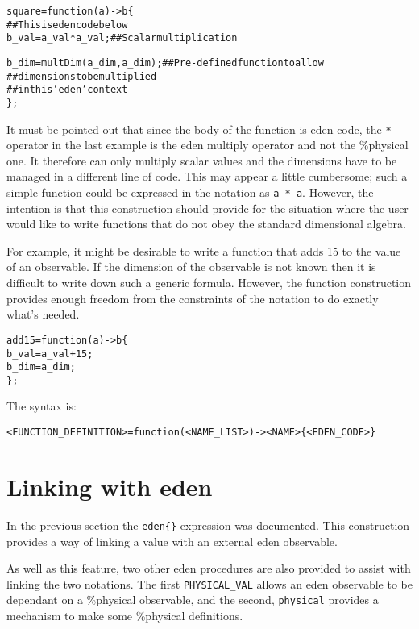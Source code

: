 \documentclass[a4paper]{article}
\begin{document}
\begin{alltt}
%physical
square = function (a) -> b \{
	## This is eden code below
	b_val = a_val*a_val;               ## Scalar multiplication

	b_dim = multDim(a_dim,a_dim);      ## Pre-defined function to allow
	                                   ##   dimensions to be multiplied
	                                   ##   in this 'eden' context 
\};
\end{alltt}
It must be pointed out that since the body of the function is eden code,
 the \texttt{*} operator in the last example is the
eden multiply operator and not the \%physical one. It therefore 
can only multiply scalar values and the dimensions have to be managed in a 
different line of code.
This may appear a little cumbersome; such a simple function
could be expressed in the notation as \texttt{a * a}. However, the 
intention is that this construction should provide for the situation where the 
user would
like to write functions that do not obey the standard dimensional algebra.

For example, it might be desirable to write a function that adds 15 to the
value of an observable. If the dimension of the observable is not known then 
it is difficult to write down such a generic formula. However, the function
construction provides enough freedom from the constraints of the notation to
do exactly what's needed.

\begin{alltt}
%physical
add15 = function (a) -> b \{
        b_val = a_val+15;
        b_dim = a_dim;     
\};
\end{alltt}





The syntax is:
\begin{alltt}
<FUNCTION_DEFINITION>  = function ( <NAME_LIST> ) -> <NAME> \{ <EDEN_CODE> \}
\end{alltt}


\section{Linking with eden}
In the previous section the \texttt{eden\{\}} expression was documented. This 
construction provides 
a way of linking a value with an external eden observable.

As well as this feature, two other eden procedures are also provided to assist 
with linking the two notations. The first \texttt{PHYSICAL\_VAL} 
allows an eden observable to be 
dependant on a \%physical observable, and the second, \texttt{physical} 
provides a mechanism to make some \%physical definitions.
\end{document}
